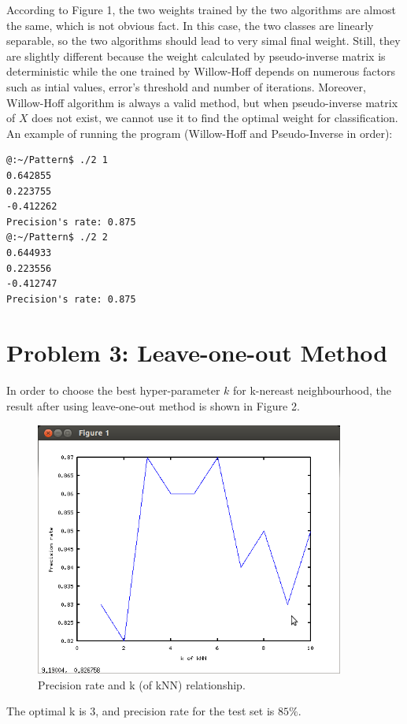 \documentclass[a4paper, 11pt]{article}
\begin{document}
According to Figure 1, the two weights trained by the two algorithms are almost the same, which is not obvious fact. In this case, the two classes are linearly separable, so the two algorithms should lead to very simal final weight. Still, they are slightly different because the weight calculated by pseudo-inverse matrix is deterministic while the one trained by Willow-Hoff depends on numerous factors such as intial values, error's threshold and number of iterations. Moreover, Willow-Hoff algorithm is always a valid method, but when pseudo-inverse matrix of $X$ does not exist, we cannot use it to find the optimal weight for classification. \\

An example of running the program (Willow-Hoff and Pseudo-Inverse in order):
\begin{verbatim}
@:~/Pattern$ ./2 1
0.642855
0.223755
-0.412262
Precision's rate: 0.875
@:~/Pattern$ ./2 2
0.644933
0.223556
-0.412747
Precision's rate: 0.875
\end{verbatim}

\section*{Problem 3: Leave-one-out Method}
In order to choose the best hyper-parameter $k$ for k-nereast neighbourhood, the result after using leave-one-out method is shown in Figure 2.
\begin{figure}[hbt]
  \centering
  \includegraphics[width=4in]{3.png}
  \caption[Close up of \textit{Hemidactylus} sp.]
  {Precision rate and k (of kNN) relationship.}
\end{figure}
The optimal k is 3, and precision rate for the test set is $85\%$. 
\end{document}
